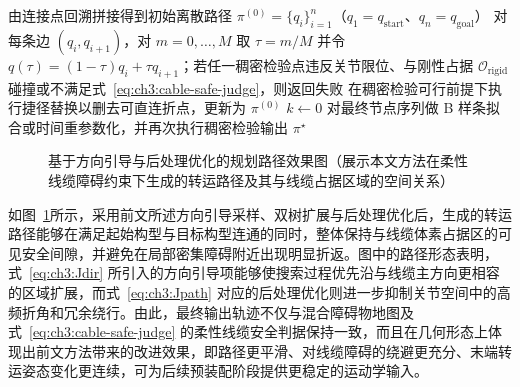 \begin{algorithm}[H]
\caption{混合障碍物地图约束下的离散路径生成与后处理优化}
\label{alg:ch3:path-gen-post}
由连接点回溯拼接得到初始离散路径 $\pi^{(0)}=\{q_i\}_{i=1}^{n}$（$q_1=q_{\mathrm{start}}$、$q_n=q_{\mathrm{goal}}$）\;
对每条边 $(q_i,q_{i+1})$，对 $m=0,\ldots,M$ 取 $\tau=m/M$ 并令 $q(\tau)=(1-\tau)q_i+\tau q_{i+1}$；若任一稠密检验点违反关节限位、与刚性占据 $\mathcal{O}_{\mathrm{rigid}}$ 碰撞或不满足式~\eqref{eq:ch3:cable-safe-judge}，则返回失败\;
在稠密检验可行前提下执行捷径替换以删去可直连折点，更新为 $\pi^{(0)}$\;
$k\leftarrow 0$\;
对最终节点序列做 B 样条拟合或时间重参数化，并再次执行稠密检验输出 $\pi^\star$\;
\end{algorithm}

\begin{figure}[htbp]
  \centering
  \caption{基于方向引导与后处理优化的规划路径效果图（展示本文方法在柔性线缆障碍约束下生成的转运路径及其与线缆占据区域的空间关系）}
  \label{fig:ch3:path-compare}
\end{figure}

如图~\ref{fig:ch3:path-compare}所示，采用前文所述方向引导采样、双树扩展与后处理优化后，生成的转运路径能够在满足起始构型与目标构型连通的同时，整体保持与线缆体素占据区的可见安全间隙，并避免在局部密集障碍附近出现明显折返。图中的路径形态表明，式~\eqref{eq:ch3:Jdir} 所引入的方向引导项能够使搜索过程优先沿与线缆主方向更相容的区域扩展，而式~\eqref{eq:ch3:Jpath} 对应的后处理优化则进一步抑制关节空间中的高频折角和冗余绕行。由此，最终输出轨迹不仅与混合障碍物地图及式~\eqref{eq:ch3:cable-safe-judge} 的柔性线缆安全判据保持一致，而且在几何形态上体现出前文方法带来的改进效果，即路径更平滑、对线缆障碍的绕避更充分、末端转运姿态变化更连续，可为后续预装配阶段提供更稳定的运动学输入。

